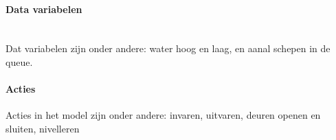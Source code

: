 \documentclass{article}
\begin{document}
	
	\paragraph{Data variabelen} \\
	Dat variabelen zijn onder andere: water hoog  en laag, en aanal schepen in de queue.
	\paragraph{Acties}
	Acties in het model zijn onder andere: invaren, uitvaren, deuren openen en sluiten, nivelleren
	
	
\end{document}
